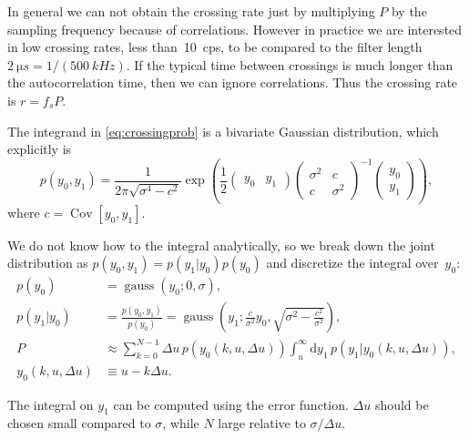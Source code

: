 In general we can not obtain the crossing rate just by multiplying $P$ by the
sampling frequency because of correlations. However in practice we are
interested in low crossing rates, less than~\SI{10}{cps}, to be compared to the
filter length $\SI{2}{\micro s} = 1/(\SI{500}{kHz})$. If the typical time
between crossings is much longer than the autocorrelation time, then we can
ignore correlations. Thus the crossing rate is $r = f_s P$.

The integrand in \autoref{eq:crossingprob} is a bivariate Gaussian
distribution, which explicitly is
%
\begin{equation}
    p(y_0,y_1) =
    \frac 1 {2\pi \sqrt{\sigma^4 - c^2}}
    \exp \left(
    \frac 1 2
    \begin{pmatrix}
        y_0 & y_1
    \end{pmatrix}
    \begin{pmatrix}
        \sigma^2 & c \\
        c & \sigma^2
    \end{pmatrix}^{-1}
    \begin{pmatrix}
        y_0 \\ y_1
    \end{pmatrix}
    \right),
\end{equation}
%
where $c = \operatorname{Cov}[y_0, y_1]$.

We do not know how to the integral analytically, so we break down the joint
distribution as $p(y_0,y_1) = p(y_1|y_0) p(y_0)$ and discretize the integral
over~$y_0$:
%
\begin{align}
    p(y_0) &= \operatorname{gauss}(y_0; 0, \sigma), \\
    p(y_1|y_0) &= \frac {p(y_0, y_1)} {p(y_0)}
    = \operatorname{gauss} \left(
        y_1; \frac c {\sigma^2} y_0, \sqrt{\sigma^2 - \frac {c^2} {\sigma^2}}
    \right), \\
    P &\approx
    \sum_{k=0}^{N-1} \Delta u\, p(y_0(k,u,\Delta u))
    \int_u^\infty \mathrm d y_1\, p(y_1|y_0(k,u,\Delta u)), \label{eq:rdisc} \\
    y_0(k,u,\Delta u) &\equiv u - k \Delta u.
\end{align}

The integral on $y_1$ can be computed using the error function. $\Delta u$
should be chosen small compared to $\sigma$, while $N$ large relative to
$\sigma / \Delta u$.


